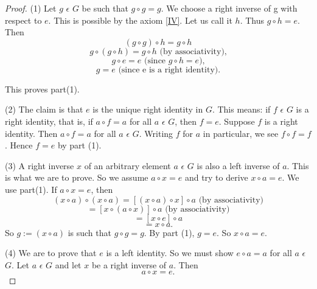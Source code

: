 \documentclass[11pt]{amsbook}
\begin{document}
\begin{proof}
(1) Let $g$ $\epsilon$ $G$ be such that $g \circ g = g$. We choose a right inverse of g with respect to $e$. This is possible by the axiom \ref{IV}. Let us call it $h$. Thus $g \circ h = e$. Then
\[
(g \circ g) \circ h = g \circ h
\]
\[
g \circ (g \circ h) = g \circ h \text{ (by associativity),}
\]
\[
g \circ e = e \text{ (since $g \circ h = e$),}
\]
\[
g = e \text{ (since e is a right identity).}
\]

This proves part(1).

(2) The claim is that $e$ is the unique right identity in $G$. This means: if $f$ $\epsilon$ $G$ is a right identity, that is, if $a \circ f =  a$ for all $a$ $\epsilon$ $G$, then $f = e$. Suppose $f$ is a right identity. Then $a \circ f = a$ for all $a$ $\epsilon$ $G$. Writing $f$ for $a$ in particular, we see $f \circ f = f$. Hence $f = e$ by part (1).

(3) A right inverse $x$ of an arbitrary element $a$ $\epsilon$ $G$ is also a left inverse of $a$. This is what we are to prove. So we assume $a \circ x = e$ and try to derive $x \circ a = e$. We use part(1). If $a \circ x = e$, then
\[
(x \circ a)\circ(x \circ a) = [(x \circ a ) \circ x] \circ a \text{ (by associativity)}
\]
\[
= [x \circ (a \circ x)] \circ a \text{ (by associativity)}
\]
\[
= [x \circ e] \circ a
\]
\[
= x \circ a. 
\]
So $g := (x \circ a)$ is such that $g \circ g = g$. By part (1), $g = e$. So $x \circ a = e$.

(4) We are to prove that $e$ is a left identity. So we must show $e \circ a = a$ for all $a$ $\epsilon$ $G$. Let $a$ $\epsilon$ $G$ and let $x$ be a right inverse of $a$. Then
\[
a \circ x = e.
\]
\end{proof}
\end{document}
